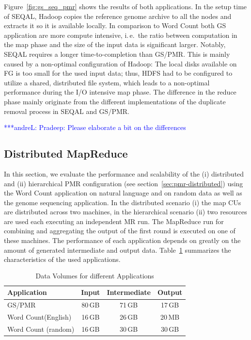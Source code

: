 \documentclass{acm_proc_article-sp}
\newcommand{\alnote}[1]{ {\textcolor{blue} { ***andreL: #1 }}}
\newcommand{\alnote}[1]{}
\begin{document}
Figure~\ref{fig:gs_seq_pmr} shows the results of both applications. In the
setup time of SEQAL, Hadoop copies the reference genome archive to all the 
nodes and extracts it so it is available locally.
In comparison to Word Count both GS application are more compute intensive,
i.\,e.\ the ratio between computation in the map phase and the size of the input
data is significant larger. Notably, SEQAL requires a longer time-to-completion
than GS/PMR. This is mainly caused by a non-optimal configuration of Hadoop: The
local disks available on FG is too small for the used input data; thus, HDFS had
to be configured to utilize a shared, distributed file system, which leads to a
non-optimal performance during the I/O intensive map phase. The difference in
the reduce phase mainly originate from the different implementations of the
duplicate removal process in SEQAL and GS/PMR. 

\alnote{Pradeep: Please elaborate a bit on the differences}

\subsection{Distributed MapReduce}

In this section, we evaluate the performance and scalability of the (i)
distributed and (ii) hierarchical PMR configuration (see
section~\ref{sec:pmr-distributed}) using the Word Count application on natural
language and on random data as well as the genome sequencing application. In the
distributed scenario (i) the map CUs are distributed across two machines, in the
hierarchical scenario (ii) two resources are used each executing an independent
MR run. The MapReduce run for combining and aggregating the output of the first
round is executed on one of these machines. The performance of each application
depends on greatly on the amount of generated intermediate and output data.
Table~\ref{tab:data-volumes} summarizes the characteristics of the used
applications.

\begin{table}[h]
	\centering
\begin{tabular}{|p{2cm}|c|c|c|}
\hline
\textbf{Application} &\textbf{Input} &\textbf{Intermediate} &\textbf{Output}\\
\hline
GS/PMR 		&80\,GB &71\,GB		 &17\,GB\\
\hline
Word Count\linebreak[4] (English) &16\,GB&26\,GB&20\,MB\\
\hline
Word Count (random) &16\,GB&30\,GB&30\,GB\\
\hline
\end{tabular}
\caption{Data Volumes for different Applications}
\label{tab:data-volumes}
\end{table}
\end{document}
